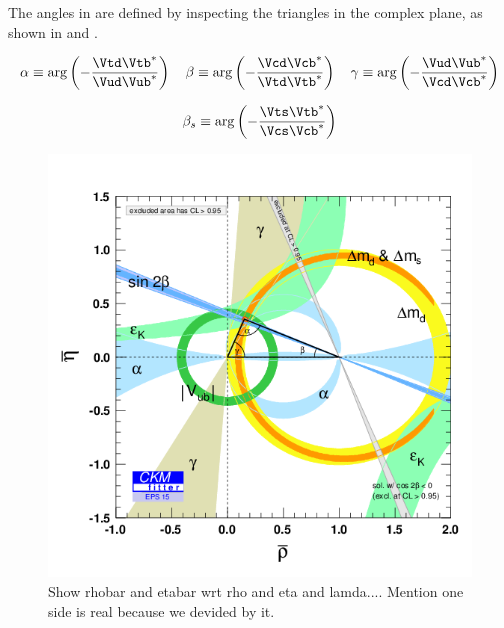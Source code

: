 \noindent The angles in  are defined by inspecting the triangles in the complex plane,
as shown in  and .

\begin{equation}
  \label{bdAnglesDef}
  \alpha \equiv \arg\left( -\frac{\Vtd\Vtb^*}{\Vud\Vub^*} \right)
  \quad
  \beta  \equiv \arg\left( -\frac{\Vcd\Vcb^*}{\Vtd\Vtb^*} \right)
  \quad
  \gamma \equiv \arg\left( -\frac{\Vud\Vub^*}{\Vcd\Vcb^*} \right)
\end{equation}

\begin{equation}
  \label{bsAnglesDef}
  \beta_s \equiv \arg\left( -\frac{\Vts\Vtb^*}{\Vcs\Vcb^*} \right)
\end{equation}

\begin{figure}[h]
  \begin{center}
    \includegraphics[trim=0cm 0cm 0cm 0cm, clip=true, width=\textwidth]{Figures/Chapter1/rhoeta_large.png}
    \caption{Show rhobar and etabar wrt rho and eta and lamda.... Mention one side is real because we devided by it.}
    \label{unitarity_triangle}
  \end{center}
\end{figure}

